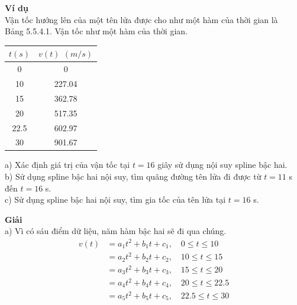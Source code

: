 \textbf{Ví dụ} \\
Vận tốc hướng lên của một tên lửa được cho như một hàm của thời gian là \\
Bảng 5.5.4.1. Vận tốc như một hàm của thời gian.

\begin{table}[h]
\centering
\begin{tabular}{|c|c|}
\hline
$t(s)$ & $v(t)$ $(m/s)$ \\
\hline
0 & 0 \\
10 & 227.04 \\
15 & 362.78 \\
20 & 517.35 \\
22.5 & 602.97 \\
30 & 901.67 \\
\hline
\end{tabular}
\end{table}

a) Xác định giá trị của vận tốc tại $t=16$ giây sử dụng nội suy spline bậc hai. \\
b) Sử dụng spline bậc hai nội suy, tìm quãng đường tên lửa đi được từ $t=11$ s đến $t=16$ s. \\
c) Sử dụng spline bậc hai nội suy, tìm gia tốc của tên lửa tại $t=16$ s.

\textbf{Giải} \\
a) Vì có sáu điểm dữ liệu, năm hàm bậc hai sẽ đi qua chúng.
\begin{align}
v(t) &= a_1t^2 + b_1t + c_1, \quad 0 \le t \le 10 \nonumber \\
&= a_2t^2 + b_2t + c_2, \quad 10 \le t \le 15 \nonumber \\
&= a_3t^2 + b_3t + c_3, \quad 15 \le t \le 20 \\
&= a_4t^2 + b_4t + c_4, \quad 20 \le t \le 22.5 \nonumber \\
&= a_5t^2 + b_5t + c_5, \quad 22.5 \le t \le 30 \nonumber
\end{align}

